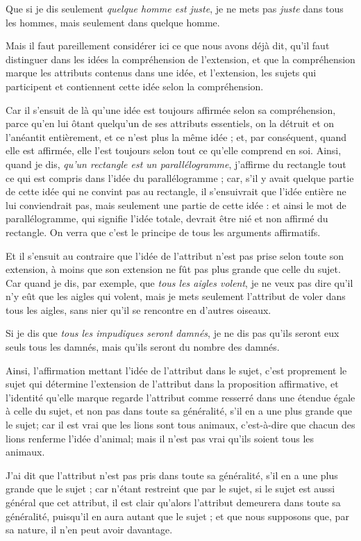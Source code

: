 Que si je dis seulement \emph{quelque homme est juste}, je ne mets pas \emph{juste} dans tous les hommes, mais seulement dans quelque homme.

Mais il faut pareillement considérer ici ce que nous avons déjà dit, qu'il faut distinguer dans les idées la compréhension de l'extension, et que la compréhension marque les attributs contenus dans une idée, et l'extension, les sujets qui participent et contiennent cette idée selon la compréhension.

Car il s'ensuit de là qu'une idée est toujours affirmée selon sa compréhension, parce qu'en lui ôtant quelqu'un de ses attributs essentiels, on la détruit et on l'anéantit entièrement, et ce n'est plus la même idée ; et, par conséquent, quand elle est affirmée, elle l'est toujours selon tout ce qu'elle comprend en soi. Ainsi, quand je dis, \emph{qu'un rectangle est un parallélogramme}, j'affirme du rectangle tout ce qui est compris dans l'idée du parallélogramme ; car, s'il y avait quelque partie de cette idée qui ne convint pas au rectangle, il s'ensuivrait que l'idée entière ne lui conviendrait pas, mais seulement une partie de cette idée : et ainsi le mot de parallélogramme, qui signifie l'idée totale, devrait être nié et non affirmé du rectangle. On verra que c'est le principe de tous les arguments affirmatifs.

Et il s'ensuit au contraire que l'idée de l'attribut n'est pas prise selon toute son extension, à moins que son extension ne fût pas plus grande que celle du sujet. Car quand je dis, par exemple, que \emph{tous les aigles volent}, je ne veux pas dire qu'il n'y eût que les aigles qui volent, mais je mets seulement l'attribut de voler dans tous les aigles, sans nier qu'il se rencontre en d'autres oiseaux.

Si je dis que \emph{tous les impudiques seront damnés}, je ne dis pas qu'ils seront eux seuls tous les damnés, mais qu'ils seront du nombre des damnés.

Ainsi, l'affirmation mettant l'idée de l'attribut dans le sujet, c'est proprement le sujet qui détermine l'extension de l'attribut dans la proposition affirmative, et l'identité qu'elle marque regarde l'attribut comme resserré dans une étendue égale à celle du sujet, et non pas dans toute sa généralité, s'il en a une plus grande que le sujet; car il est vrai que les lions sont tous animaux, c'est-à-dire que chacun des lions renferme l'idée d'animal; mais il n'est pas vrai qu'ils soient tous les animaux.

J'ai dit que l'attribut n'est pas pris dans toute sa généralité, s'il en a une plus grande que le sujet ; car n'étant restreint que par le sujet, si le sujet est aussi général que cet attribut, il est clair qu'alors l'attribut demeurera dans toute sa généralité, puisqu'il en aura autant que le sujet ; et que nous supposons que, par sa nature, il n'en peut avoir davantage.

